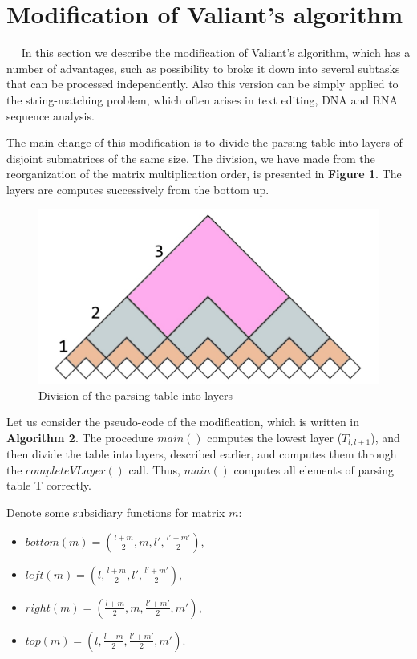 \documentclass{article}
\begin{document}
\section{Modification of Valiant's algorithm}
 
 $\quad$ In this section we describe the modification of Valiant's algorithm, which has a number of advantages, such as possibility to broke it down into several subtasks that can be processed independently. Also this version can be simply applied to the string-matching problem, which often arises in text editing, DNA and RNA sequence analysis.
 
 The main change of this modification is to divide the parsing table into layers of disjoint submatrices of the same size.
 The division, we have made from the reorganization of the matrix multiplication order, is presented in \textbf{Figure 1}. 
 The layers are computes successively from the bottom up.
 
\begin{figure}[h!]
\centering
\includegraphics[scale=0.4]{layers}
\caption{Division of the parsing table into layers}
\label{fig:universe}
\end{figure}

 Let us consider the pseudo-code of the modification, which is written in \textbf{Algorithm 2}. The procedure $main()$ computes the lowest layer ($T_{l, l+1}$), and then divide the table into layers, described earlier, and computes them through the $completeVLayer()$ call. Thus, $main()$ computes all elements of parsing table T correctly.
 
 Denote some subsidiary functions for matrix $m$:
  \begin{itemize}
   \item $bottom(m) = (\frac{l+m}{2}, m, l', \frac{l'+m'}{2})$,
   \item $left(m) = (l, \frac{l+m}{2}, l', \frac{l'+m'}{2})$,
   \item $right(m) = (\frac{l+m}{2}, m, \frac{l'+m'}{2}, m')$, 
   \item $top(m) = (l, \frac{l+m}{2}, \frac{l'+m'}{2}, m')$.
 \end{itemize}
 
\end{document}

